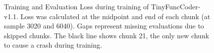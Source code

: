 \begin{figure}[!h]
    \caption{Training and Evaluation Loss during training of TinyFuncCoder-v1.1. Loss was calculated at the midpoint and end of each chunk (at sample 3020 and 6040). Gaps represent missing evaluations due to skipped chunks. The black line shows chunk 21, the only new chunk to cause a crash during training.}
    \label{fig:v1.1loss}
\end{figure}